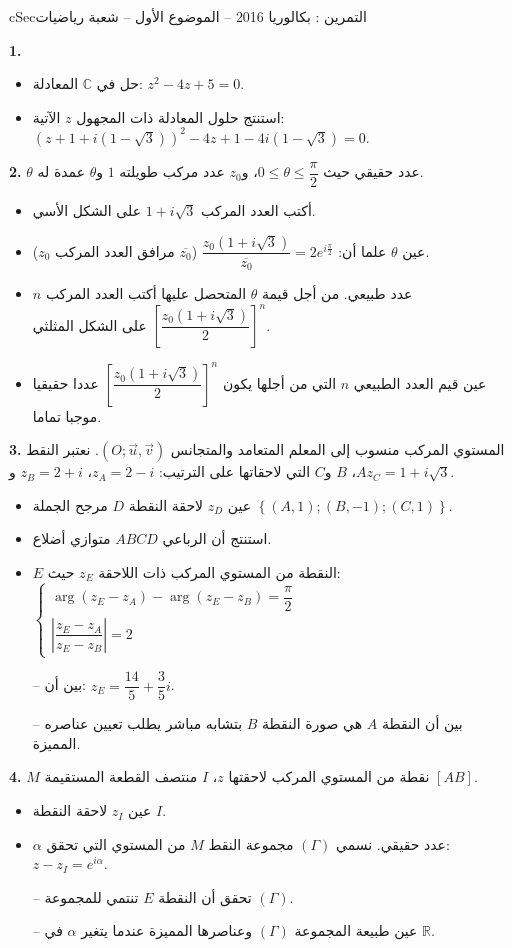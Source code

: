 \documentclass[12pt,a4paper]{article}
\newenvironment{BOX}[2]{\begin{otherlanguage}{english}\begin{arbox}{#1}{#2}}{\end{arbox}\end{otherlanguage}}
\newcounter{exo}
\newenvironment{tamrin}[1]{\stepcounter{exo}\begin{BOX}{cSec}{التمرين \theexo: #1}}{\end{BOX}}
\newenvironment{sq}{\begin{itemize}[leftmargin=2.4em,itemsep=3pt]}{\end{itemize}}
\newcommand{\qa}{\item[(أ)]}\newcommand{\qb}{\item[(ب)]}\newcommand{\qc}{\item[(جـ)]}\newcommand{\qd}{\item[(د)]}\newcommand{\qe}{\item[(هـ)]}
\newcommand{\QQ}[1]{\par\smallskip\textbf{#1.} }
\begin{document}
\begin{tamrin}{بكالوريا 2016 -- الموضوع الأول -- شعبة رياضيات}
\QQ{1}
\begin{sq}
\qa حل في $\mathbb{C}$ المعادلة: $z^2-4z+5=0$.
\qb استنتج حلول المعادلة ذات المجهول $z$ الآتية: $\left(z+1+i\left(1-\sqrt3\right)\right)^2-4z+1-4i\left(1-\sqrt3\right)=0$.
\end{sq}
\QQ{2} $\theta$ عدد حقيقي حيث $0\leq\theta\leq\dfrac{\pi}{2}$، و$z_0$ عدد مركب طويلته $1$ و$\theta$ عمدة له.
\begin{sq}
\qa أكتب العدد المركب $1+i\sqrt3$ على الشكل الأسي.
\qb عين $\theta$ علما أن: $\dfrac{z_0\left(1+i\sqrt3\right)}{\overline{z_0}}=2e^{i\frac{\pi}{2}}$ ($\overline{z_0}$ مرافق العدد المركب $z_0$).
\qc $n$ عدد طبيعي. من أجل قيمة $\theta$ المتحصل عليها أكتب العدد المركب $\left[\dfrac{z_0\left(1+i\sqrt3\right)}{2}\right]^n$ على الشكل المثلثي.
\qd عين قيم العدد الطبيعي $n$ التي من أجلها يكون $\left[\dfrac{z_0\left(1+i\sqrt3\right)}{2}\right]^n$ عددا حقيقيا موجبا تماما.
\end{sq}
\QQ{3} المستوي المركب منسوب إلى المعلم المتعامد والمتجانس $\left(O;\vec u,\vec v\right)$.
نعتبر النقط $A$، $B$ و$C$ التي لاحقاتها على الترتيب: $z_A=2-i$، $z_B=2+i$ و$z_C=1+i\sqrt3$.
\begin{sq}
\qa عين $z_D$ لاحقة النقطة $D$ مرجح الجملة $\left\{(A,1);(B,-1);(C,1)\right\}$.
\qb استنتج أن الرباعي $ABCD$ متوازي أضلاع.
\qc $E$ النقطة من المستوي المركب ذات اللاحقة $z_E$ حيث:
$\begin{cases}\arg\left(z_E-z_A\right)-\arg\left(z_E-z_B\right)=\dfrac{\pi}{2}\\[4pt] \left|\dfrac{z_E-z_A}{z_E-z_B}\right|=2\end{cases}$

-- بين أن: $z_E=\dfrac{14}{5}+\dfrac35i$.\par
-- بين أن النقطة $A$ هي صورة النقطة $B$ بتشابه مباشر يطلب تعيين عناصره المميزة.
\end{sq}
\QQ{4} $M$ نقطة من المستوي المركب لاحقتها $z$، $I$ منتصف القطعة المستقيمة $[AB]$.
\begin{sq}
\qa عين $z_I$ لاحقة النقطة $I$.
\qb $\alpha$ عدد حقيقي. نسمي $(\Gamma)$ مجموعة النقط $M$ من المستوي التي تحقق: $z-z_I=e^{i\alpha}$.

-- تحقق أن النقطة $E$ تنتمي للمجموعة $(\Gamma)$.\par
-- عين طبيعة المجموعة $(\Gamma)$ وعناصرها المميزة عندما يتغير $\alpha$ في $\mathbb{R}$.
\end{sq}
\end{tamrin}
\end{document}
